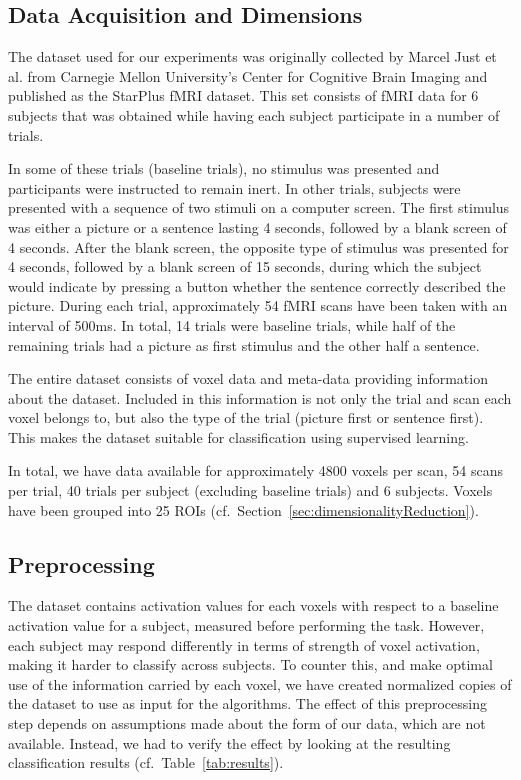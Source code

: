 \documentclass[preprint,journal,11pt]{vgtc}
\begin{document}
\subsection{Data Acquisition and Dimensions}

The dataset used for our experiments was originally collected by Marcel Just et al. from Carnegie Mellon University's Center for Cognitive Brain Imaging and published as the StarPlus fMRI dataset. This set consists of fMRI data for 6 subjects that was obtained while having each subject participate in a number of trials.

In some of these trials (baseline trials), no stimulus was presented and participants were instructed to remain inert. In other trials, subjects were presented with a sequence of two stimuli on a computer screen. The first stimulus was either a picture or a sentence lasting 4 seconds, followed by a blank screen of 4 seconds. After the blank screen, the opposite type of stimulus was presented for 4 seconds, followed by a blank screen of 15 seconds, during which the subject would indicate by pressing a button whether the sentence correctly described the picture. During each trial, approximately 54 fMRI scans have been taken with an interval of 500ms. In total, 14 trials were baseline trials, while half of the remaining trials had a picture as first stimulus and the other half a sentence.

The entire dataset consists of voxel data and meta-data providing information about the dataset. Included in this information is not only the trial and scan each voxel belongs to, but also the type of the trial (picture first or sentence first). This makes the dataset suitable for classification using supervised learning.

In total, we have data available for approximately 4800 voxels per scan, 54 scans per trial, 40 trials per subject (excluding baseline trials) and 6 subjects. Voxels have been grouped into 25 ROIs (cf.~Section~\ref{sec:dimensionalityReduction}).

\subsection{Preprocessing}
\label{sec:preprocessing}

The dataset contains activation values for each voxels with respect to a baseline activation value for a subject, measured before performing the task. However, each subject may respond differently in terms of strength of voxel activation, making it harder to classify across subjects. To counter this, and make optimal use of the information carried by each voxel, we have created normalized copies of the dataset to use as input for the algorithms. The effect of this preprocessing step depends on assumptions made about the form of our data, which are not available. Instead, we had to verify the effect by looking at the resulting classification results (cf.~Table~\ref{tab:results}).
\end{document}

